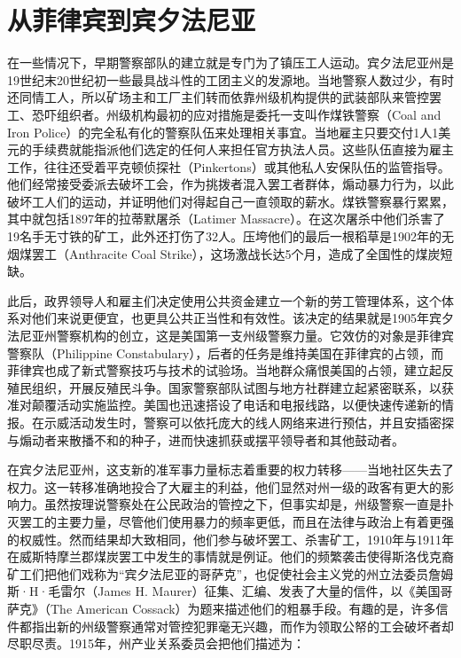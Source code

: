 \documentclass[fontset=fandol, a4paper, 12pt, openright]{ctexbook}
\begin{document}
\section{从菲律宾到宾夕法尼亚}

在一些情况下，早期警察部队的建立就是专门为了镇压工人运动。宾夕法尼亚州是19世纪末20世纪初一些最具战斗性的工团主义的发源地。当地警察人数过少，有时还同情工人，所以矿场主和工厂主们转而依靠州级机构提供的武装部队来管控罢工、恐吓组织者。州级机构最初的应对措施是委托一支叫作煤铁警察（Coal and Iron Police）的完全私有化的警察队伍来处理相关事宜。当地雇主只要交付1人1美元的手续费就能指派他们选定的任何人来担任官方执法人员。这些队伍直接为雇主工作，往往还受着平克顿侦探社（Pinkertons）或其他私人安保队伍的监管指导。他们经常接受委派去破坏工会，作为挑拨者混入罢工者群体，煽动暴力行为，以此破坏工人们的运动，并证明他们对得起自己一直领取的薪水。煤铁警察暴行累累，其中就包括1897年的拉蒂默屠杀（Latimer Massacre）。在这次屠杀中他们杀害了19名手无寸铁的矿工，此外还打伤了32人。压垮他们的最后一根稻草是1902年的无烟煤罢工（Anthracite Coal Strike），这场激战长达5个月，造成了全国性的煤炭短缺。

此后，政界领导人和雇主们决定使用公共资金建立一个新的劳工管理体系，这个体系对他们来说更便宜，也更具公共正当性和有效性。该决定的结果就是1905年宾夕法尼亚州警察机构的创立，这是美国第一支州级警察力量。它效仿的对象是菲律宾警察队（Philippine Constabulary），后者的任务是维持美国在菲律宾的占领，而菲律宾也成了新式警察技巧与技术的试验场。当地群众痛恨美国的占领，建立起反殖民组织，开展反殖民斗争。国家警察部队试图与地方社群建立起紧密联系，以获准对颠覆活动实施监控。美国也迅速搭设了电话和电报线路，以便快速传递新的情报。在示威活动发生时，警察可以依托庞大的线人网络来进行预估，并且安插密探与煽动者来散播不和的种子，进而快速抓获或摆平领导者和其他鼓动者。

在宾夕法尼亚州，这支新的准军事力量标志着重要的权力转移——当地社区失去了权力。这一转移准确地投合了大雇主的利益，他们显然对州一级的政客有更大的影响力。虽然按理说警察处在公民政治的管控之下，但事实却是，州级警察一直是扑灭罢工的主要力量，尽管他们使用暴力的频率更低，而且在法律与政治上有着更强的权威性。然而结果却大致相同，他们参与破坏罢工、杀害矿工，1910年与1911年在威斯特摩兰郡煤炭罢工中发生的事情就是例证。他们的频繁袭击使得斯洛伐克裔矿工们把他们戏称为“宾夕法尼亚的哥萨克”，也促使社会主义党的州立法委员詹姆斯·H·毛雷尔（James H. Maurer）征集、汇编、发表了大量的信件，以《美国哥萨克》（The American Cossack）为题来描述他们的粗暴手段。有趣的是，许多信件都指出新的州级警察通常对管控犯罪毫无兴趣，而作为领取公帑的工会破坏者却尽职尽责。1915年，州产业关系委员会把他们描述为：
\end{document}
